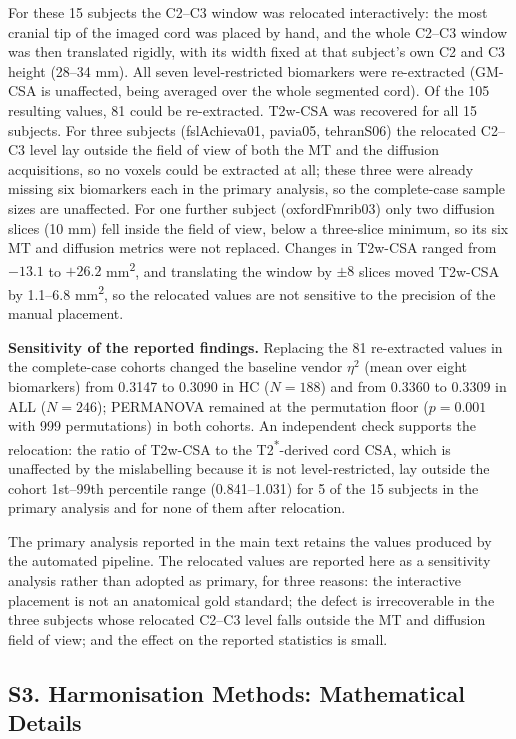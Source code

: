 \documentclass[12pt,a4paper]{article}
\begin{document}
For these 15 subjects the C2--C3 window was relocated interactively: the most cranial tip of the imaged cord was placed by hand, and the whole C2--C3 window was then translated rigidly, with its width fixed at that subject's own C2 and C3 height (28--34 mm). All seven level-restricted biomarkers were re-extracted (GM-CSA is unaffected, being averaged over the whole segmented cord). Of the 105 resulting values, 81 could be re-extracted. T2w-CSA was recovered for all 15 subjects. For three subjects (fslAchieva01, pavia05, tehranS06) the relocated C2--C3 level lay outside the field of view of both the MT and the diffusion acquisitions, so no voxels could be extracted at all; these three were already missing six biomarkers each in the primary analysis, so the complete-case sample sizes are unaffected. For one further subject (oxfordFmrib03) only two diffusion slices (10 mm) fell inside the field of view, below a three-slice minimum, so its six MT and diffusion metrics were not replaced. Changes in T2w-CSA ranged from $-13.1$ to $+26.2$ mm\textsuperscript{2}, and translating the window by $\pm8$ slices moved T2w-CSA by 1.1--6.8 mm\textsuperscript{2}, so the relocated values are not sensitive to the precision of the manual placement.

\textbf{Sensitivity of the reported findings.} Replacing the 81 re-extracted values in the complete-case cohorts changed the baseline vendor $\eta^2$ (mean over eight biomarkers) from 0.3147 to 0.3090 in HC ($N=188$) and from 0.3360 to 0.3309 in ALL ($N=246$); PERMANOVA remained at the permutation floor ($p=0.001$ with 999 permutations) in both cohorts. An independent check supports the relocation: the ratio of T2w-CSA to the T2\textsuperscript{*}-derived cord CSA, which is unaffected by the mislabelling because it is not level-restricted, lay outside the cohort 1st--99th percentile range (0.841--1.031) for 5 of the 15 subjects in the primary analysis and for none of them after relocation.

The primary analysis reported in the main text retains the values produced by the automated pipeline. The relocated values are reported here as a sensitivity analysis rather than adopted as primary, for three reasons: the interactive placement is not an anatomical gold standard; the defect is irrecoverable in the three subjects whose relocated C2--C3 level falls outside the MT and diffusion field of view; and the effect on the reported statistics is small.

\subsection*{S3. Harmonisation Methods: Mathematical Details}
\end{document}
